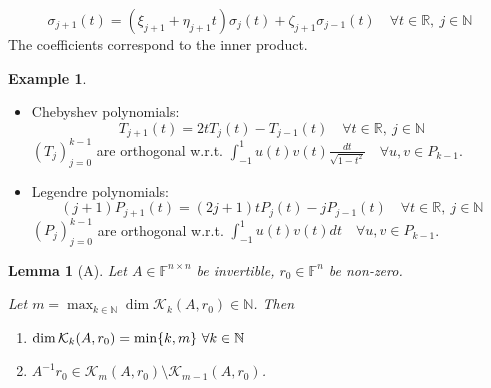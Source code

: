 \documentclass[12pt]{article}
\newtheorem{lemma}[theorem]{Lemma}
\theoremstyle{definition}
\newtheorem*{example*}{Example}
\theoremstyle{remark}
\numberwithin{equation}{section}
\newcommand{\F}{\mathbb{F}}
\newcommand{\R}{\mathbb{R}}
\newcommand{\N}{\mathbb{N}}
\newcommand{\K}{\mathcal{K}}
\DeclarePairedDelimiter{\set}{\{}{\}}
\begin{document}
\begin{equation*}
  \sigma_{j+1}(t) = (\xi_{j+1} + \eta_{j+1} t) \sigma_j(t) + \zeta_{j+1} \sigma_{j-1}(t) \quad \forall t \in \R,\ j \in \N
\end{equation*}
The coefficients correspond to the inner product.
\begin{example*}
  \begin{itemize}
    \item Chebyshev polynomials:
      \begin{equation*}
        T_{j+1}(t) = 2t T_j(t) - T_{j-1}(t) \quad \forall t \in \R,\ j \in \N
      \end{equation*}
      $(T_j)_{j=0}^{k-1}$ are orthogonal w.r.t. $\int_{-1}^1 u(t)v(t) \frac{dt}{\sqrt{1-t^2}} \quad \forall u,v \in P_{k-1}$.

    \item Legendre polynomials:
      \begin{equation*}
        (j+1) P_{j+1}(t) = (2j + 1) t P_j(t) - j P_{j-1}(t) \quad \forall t \in \R,\ j \in \N
      \end{equation*}
      $(P_j)_{j=0}^{k-1}$ are orthogonal w.r.t. $\int_{-1}^1 u(t)v(t) dt \quad \forall u,v \in P_{k-1}$.
  \end{itemize}
\end{example*}
\addtocounter{theorem}{-1}
\begin{lemma}[A]
  \label{lem:8.1A}
  Let $A \in \F^{n\times n}$ be invertible, $r_0 \in \F^n$ be non-zero.

  Let $m = \max_{k \in \N} \dim \K_k(A,r_0) \in \N$. Then
  \begin{enumerate}[label=(\roman*)]
    \item $\dim \K_k(A,r_0) = \min\set{k,m}\ \forall k \in \N$
    \item $A^{-1} r_0 \in \K_m(A,r_0) \setminus \K_{m-1}(A,r_0)$.
  \end{enumerate}
\end{lemma}
\end{document}
